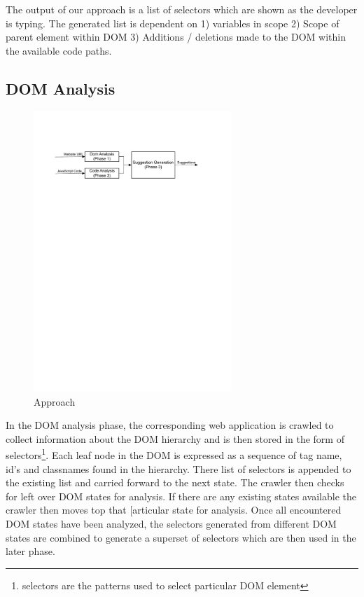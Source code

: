 	
		The output of our approach is a list of \css selectors which are shown as the developer is typing. The generated list is dependent on 1) \javascript variables in scope 2) Scope of parent element within DOM 3) Additions / deletions made to the DOM within the available code paths.
	
	\subsection{DOM Analysis}
	\label{Sec:DOM-Analysis}
		\begin{figure}
			\centering
			\includegraphics[width=75mm]{images/overview.pdf}
			\caption{Approach}
			\label{Fig:Approach}
		\end{figure}
		
		In the DOM analysis phase, the corresponding web application is crawled to collect information about the DOM hierarchy and is then stored in the form of \css selectors\footnote{\css selectors are the patterns used to select particular DOM element}. Each leaf node in the DOM is expressed as a sequence of tag name, id's and classnames found in the hierarchy. There list of \css selectors is appended to the existing list and carried forward to the next state. The crawler then checks for left over DOM states for analysis. If there are any existing states available the crawler then moves top that [articular state for analysis.	 Once all encountered DOM states have been analyzed, the \css selectors generated from different DOM states are combined to generate a superset of \css selectors which are then used in the later phase.
		
